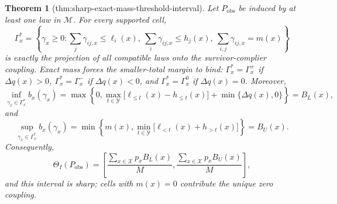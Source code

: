 \documentclass{article}
\newtheorem{theorem}{Theorem}
\begin{document}
\begin{theorem}[thm:sharp-exact-mass-threshold-interval]\label{thm:sharp-exact-mass-threshold-interval}
Let \(P_{\mathrm{obs}}\) be induced by at least one law in \(\mathcal M\).  For every supported cell,
\[
\Gamma_x^{\ast}=\left\{\gamma_x\ge0:\sum_j\gamma_{ij,x}\le\ell_i(x),\ \sum_i\gamma_{ij,x}\le h_j(x),\ \sum_{i,j}\gamma_{ij,x}=m(x)\right\}
\]
is exactly the projection of all compatible laws onto the survivor-complier coupling.  Exact mass forces the smaller-total margin to bind: \(\Gamma_x^{\ast}=\Gamma_x^{+}\) if \(\Delta q(x)>0\), \(\Gamma_x^{\ast}=\Gamma_x^{-}\) if \(\Delta q(x)<0\), and \(\Gamma_x^{\ast}=\Gamma_x^{0}\) if \(\Delta q(x)=0\).  Moreover,
\[
\inf_{\gamma_x\in\Gamma_x^{\ast}}b_x(\gamma_x)
=\max\left\{0,\max_{t\in\mathcal Y}\bigl[\ell_{\le t}(x)-h_{\le t}(x)\bigr]+\min\{\Delta q(x),0\}\right\}=B_L(x),
\]
and
\[
\sup_{\gamma_x\in\Gamma_x^{\ast}}b_x(\gamma_x)
=\min\left\{m(x),\min_{t\in\mathcal Y}\bigl[\ell_{<t}(x)+h_{>t}(x)\bigr]\right\}=B_U(x).
\]
Consequently,
\[
\Theta_I(P_{\mathrm{obs}})
=\left[\frac{\sum_{x\in\mathcal X}p_xB_L(x)}{M},\frac{\sum_{x\in\mathcal X}p_xB_U(x)}{M}\right],
\]
and this interval is sharp; cells with \(m(x)=0\) contribute the unique zero coupling.
\end{theorem}
\end{document}
